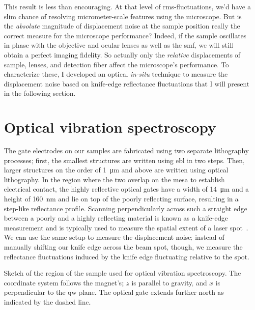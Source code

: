 This result is less than encouraging.
At that level of \gls{rms}-fluctuations, we'd have a slim chance of resolving micrometer-scale features using the microscope.
But is the \emph{absolute} magnitude of displacement noise at the sample position really the correct measure for the microscope performance?
Indeed, if the sample oscillates in phase with the objective and ocular lenses as well as the \gls{smf}, we will still obtain a perfect imaging fidelity.
So actually only the \emph{relative} displacements of sample, lenses, and detection fiber affect the microscope's performance.
To characterize these, I developed an optical \emph{in-situ} technique to measure the displacement noise based on knife-edge reflectance fluctuations that I will present in the following section.

\section{Optical vibration spectroscopy}\label{sec:setup:vibrations:optic}
The gate electrodes on our samples are fabricated using two separate lithography processes; first, the smallest structures are written using \gls{ebl} in two steps.
Then, larger structures on the order of \qty{1}{\micro\meter} and above are written using optical lithography.
In the region where the two overlap on the mesa to establish electrical contact, the highly reflective  optical gates have a width of \qty{14}{\micro\meter} and a height of \qty{160}{\nano\meter} and lie on top of the poorly reflecting  surface, resulting in a step-like reflectance profile.
Scanning perpendicularly across such a straight edge between a poorly and a highly reflecting material is known as a knife-edge measurement and is typically used to measure the spatial extent of a laser spot~\cite{Arnaud1971,Skinner1972,Khosrofian1983}.
We can use the same setup to measure the displacement noise; instead of manually shifting our knife edge across the beam spot, though, we measure the reflectance fluctuations induced by the knife edge fluctuating relative to the spot.

\begin{marginfigure}
    \centering
    
    \caption[]{
        Sketch of the region of the sample used for optical vibration spectroscopy.
        The coordinate system follows the magnet's; $z$ is parallel to gravity, and $x$ is perpendicular to the \gls{qw} plane.
        The optical gate extends further north as indicated by the dashed line.
    }
    \label{fig:setup:vibrations:knife_edge:sketch}
\end{marginfigure}

